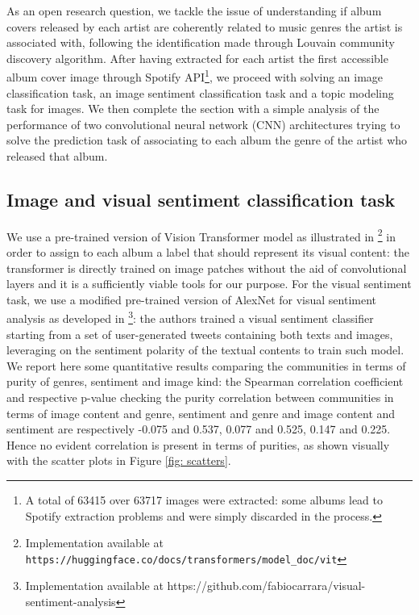 \documentclass[sigchi]{acmart}
\begin{document}
As an open research question, we tackle the issue of understanding if album covers released by each artist are coherently related to music genres the artist is associated with, following the identification made through Louvain community discovery algorithm. After having extracted for each artist the first accessible album cover image through Spotify API\footnote{A total of 63415 over 63717 images were extracted: some albums lead to Spotify extraction problems and were simply discarded in the process.}, we proceed with solving an image classification task, an image sentiment classification task and a topic modeling task for images. We then complete the section with a simple analysis of the performance of two convolutional neural network (CNN) architectures trying to solve the prediction task of associating to each album the genre of the artist who released that album.

\subsection{Image and visual sentiment classification task}
We use a pre-trained version of Vision Transformer model as illustrated in \cite{dosovitskiy2021image}\footnote{Implementation available at \nolinkurl{https://huggingface.co/docs/transformers/model_doc/vit}} in order to assign to each album a label that should represent its visual content: the transformer is directly trained on image patches without the aid of convolutional layers and it is a sufficiently viable tools for our purpose. For the visual sentiment task, we use a modified pre-trained version of AlexNet for visual sentiment analysis as developed in \cite{Vadicamo_2017_ICCV}\footnote{Implementation available at https://github.com/fabiocarrara/visual-sentiment-analysis}: the authors trained a visual sentiment classifier starting from a set of user-generated tweets containing both texts and images, leveraging on the sentiment polarity of the textual contents to train such model. We report here some quantitative results comparing the communities in terms of purity of genres, sentiment and image kind: the Spearman correlation coefficient and respective p-value checking the purity correlation between communities in terms of image content and genre, sentiment and genre and image content and sentiment are respectively -0.075 and 0.537, 0.077 and 0.525, 0.147 and 0.225. Hence no evident correlation is present in terms of purities, as shown visually with the scatter plots in Figure \ref{fig: scatters}.
\end{document}
